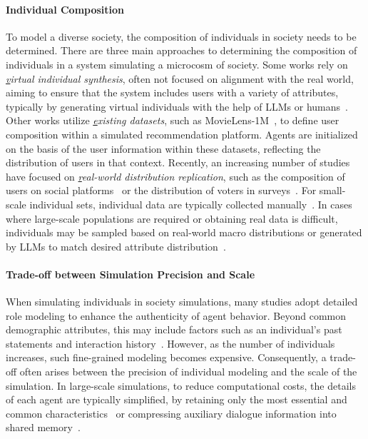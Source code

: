 \paragraph{Individual Composition} 
To model a diverse society, the composition of individuals in society needs to be determined. There are three main approaches to determining the composition of individuals in a system simulating a microcosm of society. Some works rely on \textit{{\ul virtual individual synthesis}}, often not focused on alignment with the real world, aiming to ensure that the system includes users with a variety of attributes, typically by generating virtual individuals with the help of LLMs or humans~\cite{chuang2024wisdom,binz2023turning}. Other works utilize \textit{{\ul existing datasets}}, such as MovieLens-1M~\cite{wang2023recagent,Zhang2024on}, to define user composition within a simulated recommendation platform. Agents are initialized on the basis of the user information within these datasets, reflecting the distribution of users in that context. Recently, an increasing number of studies have focused on \textit{{\ul real-world distribution replication}}, such as the composition of users on social platforms~\cite{yang2024oasis} or the distribution of voters in surveys~\cite{zhang2024electionsim}. For small-scale individual sets, individual data are typically collected manually~\cite{park2023choicemates,park2024generative}. In cases where large-scale populations are required or obtaining real data is difficult, individuals may be sampled based on real-world macro distributions or generated by LLMs to match desired attribute distribution~\cite{Argyle_2023,lee2023can,zhang2024electionsim}.

\paragraph{Trade-off between Simulation Precision and Scale}
When simulating individuals in society simulations, many studies adopt detailed role modeling to enhance the authenticity of agent behavior. Beyond common demographic attributes, this may include factors such as an individual’s past statements and interaction history~\cite{park2023generative,wang2023recagent,Zhang2024on,zhaocompeteai,fontana2024nicer}. However, as the number of individuals increases, such fine-grained modeling becomes expensive. Consequently, a trade-off often arises between the precision of individual modeling and the scale of the simulation. In large-scale simulations, to reduce computational costs, the details of each agent are typically simplified, by retaining only the most essential and common characteristics~\cite{williams2023epidemic,chopra2024limits} or compressing auxiliary dialogue information into shared memory~\cite{yu2024affordable}.

